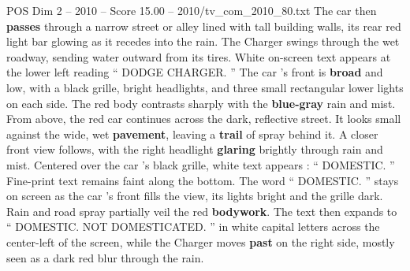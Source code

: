 \begin{textsample}{POS Dim 2 – 2010 – Score 15.00 – 2010/tv\_com\_2010\_80.txt}
The car then \textbf{passes} through a narrow street or alley lined with tall building walls, its rear red light bar glowing as it recedes into the rain.
The Charger swings through the wet roadway, sending water outward from its tires.
White on-screen text appears at the lower left reading “ DODGE CHARGER. ” The car ’s front is \textbf{broad} and low, with a black grille, bright headlights, and three small rectangular lower lights on each side.
The red body contrasts sharply with the \textbf{blue-gray} rain and mist.
From above, the red car continues across the dark, reflective street.
It looks small against the wide, wet \textbf{pavement}, leaving a \textbf{trail} of spray behind it.
A closer front view follows, with the right headlight \textbf{glaring} brightly through rain and mist.
Centered over the car ’s black grille, white text appears : “ DOMESTIC. ” Fine-print text remains faint along the bottom.
The word “ DOMESTIC. ” stays on screen as the car ’s front fills the view, its lights bright and the grille dark.
Rain and road spray partially veil the red \textbf{bodywork}.
The text then expands to “ DOMESTIC.
NOT DOMESTICATED. ” in white capital letters across the center-left of the screen, while the Charger moves \textbf{past} on the right side, mostly seen as a dark red blur through the rain.

\end{textsample}
